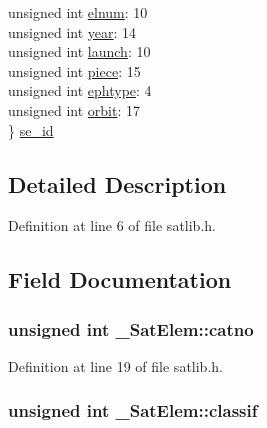 \begin{DoxyCompactItemize}
\begin{tabbing}
\>unsigned int \hyperlink{struct___sat_elem_a8f27690ed10a4c11f8347d15cc339f03}{elnum}: 10\\
\>unsigned int \hyperlink{struct___sat_elem_a203379207f7fc2daca8632f639950974}{year}: 14\\
\>unsigned int \hyperlink{struct___sat_elem_a78bf01cbb8fcb2cbd6b896b6ca88ff0c}{launch}: 10\\
\>unsigned int \hyperlink{struct___sat_elem_a94bd5ae73f4c4bb55677d3a0e998eef2}{piece}: 15\\
\>unsigned int \hyperlink{struct___sat_elem_a84743e8c5b4eed8213b2402e1d5ef7f4}{ephtype}: 4\\
\>unsigned int \hyperlink{struct___sat_elem_a44123ee50a25e6ec959b8683803e561e}{orbit}: 17\\
\} \hyperlink{struct___sat_elem_af713f30c8d04002d6b3f7ac53c19740e}{se\_id}\\

\end{tabbing}\end{DoxyCompactItemize}


\subsection{Detailed Description}


Definition at line 6 of file satlib.\-h.



\subsection{Field Documentation}
\hypertarget{struct___sat_elem_a1bf11c0e76b4a6e2e34485990276cca6}{
\subsubsection[{catno}]{\setlength{\rightskip}{0pt plus 5cm}unsigned int \-\_\-\-Sat\-Elem\-::catno}}\label{struct___sat_elem_a1bf11c0e76b4a6e2e34485990276cca6}


Definition at line 19 of file satlib.\-h.

\hypertarget{struct___sat_elem_a99c4f0b298134a76356c70ae6cf13a26}{
\subsubsection[{classif}]{\setlength{\rightskip}{0pt plus 5cm}unsigned int \-\_\-\-Sat\-Elem\-::classif}}\label{struct___sat_elem_a99c4f0b298134a76356c70ae6cf13a26}


